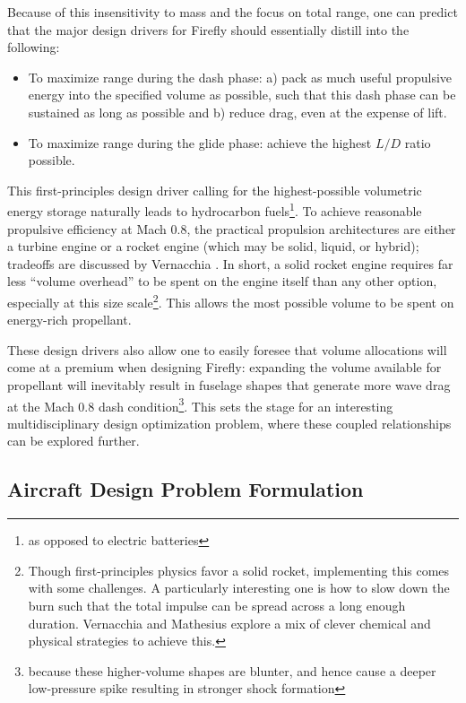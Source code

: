 Because of this insensitivity to mass and the focus on total range, one can predict that the major design drivers for Firefly should essentially distill into the following:
\begin{itemize}[noitemsep]
    \item To maximize range during the dash phase: a) pack as much useful propulsive energy into the specified volume as possible, such that this dash phase can be sustained as long as possible and b) reduce drag, even at the expense of lift.
    \item To maximize range during the glide phase: achieve the highest $L/D$ ratio possible.
\end{itemize}

This first-principles design driver calling for the highest-possible volumetric energy storage naturally leads to hydrocarbon fuels\footnote{as opposed to electric batteries}. To achieve reasonable propulsive efficiency at Mach 0.8, the practical propulsion architectures are either a turbine engine or a rocket engine (which may be solid, liquid, or hybrid); tradeoffs are discussed by Vernacchia \cite{vernacchia_development_2020}. In short, a solid rocket engine requires far less ``volume overhead'' to be spent on the engine itself than any other option, especially at this size scale\footnote{Though first-principles physics favor a solid rocket, implementing this comes with some challenges. A particularly interesting one is how to slow down the burn such that the total impulse can be spread across a long enough duration. Vernacchia \cite{vernacchia_development_2020} and Mathesius \cite{mathesius_integrated_2023, mathesius_firefly_2019} explore a mix of clever chemical and physical strategies to achieve this.}. This allows the most possible volume to be spent on energy-rich propellant.

These design drivers also allow one to easily foresee that volume allocations will come at a premium when designing Firefly: expanding the volume available for propellant will inevitably result in fuselage shapes that generate more wave drag at the Mach 0.8 dash condition\footnote{because these higher-volume shapes are blunter, and hence cause a deeper low-pressure spike resulting in stronger shock formation}. This sets the stage for an interesting multidisciplinary design optimization problem, where these coupled relationships can be explored further.

\subsection{Aircraft Design Problem Formulation}
\label{sec:firefly-mdo}

